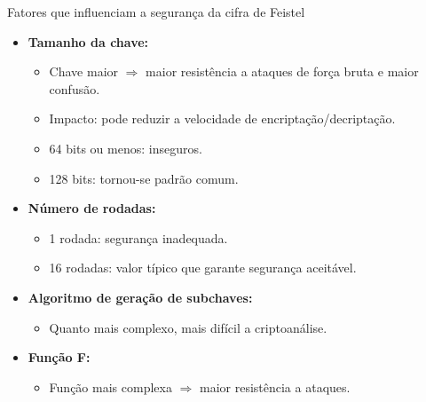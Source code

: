\begin{frame}{Fatores que influenciam a segurança da cifra de Feistel}
    \begin{itemize}
        \item \textbf{Tamanho da chave:}
              \begin{itemize}
                  \item Chave maior $\Rightarrow$ maior resistência a ataques de força bruta e maior confusão.
                  \item Impacto: pode reduzir a velocidade de encriptação/decriptação.
                  \item 64 bits ou menos: inseguros.
                  \item 128 bits: tornou-se padrão comum.
              \end{itemize}

        \item \textbf{Número de rodadas:}
              \begin{itemize}
                  \item 1 rodada: segurança inadequada.
                  \item 16 rodadas: valor típico que garante segurança aceitável.
              \end{itemize}

        \item \textbf{Algoritmo de geração de subchaves:}
              \begin{itemize}
                  \item Quanto mais complexo, mais difícil a criptoanálise.
              \end{itemize}

        \item \textbf{Função F:}
              \begin{itemize}
                  \item Função mais complexa $\Rightarrow$ maior resistência a ataques.
              \end{itemize}
    \end{itemize}
\end{frame}

